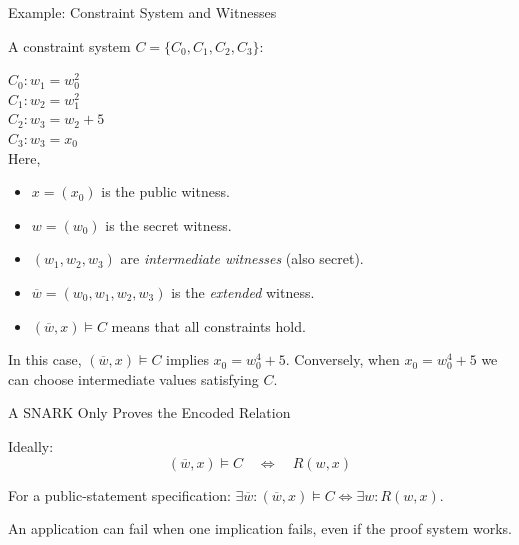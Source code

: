 \documentclass[aspectratio=169,11pt]{beamer}
\begin{document}
\begin{frame}{Example: Constraint System and Witnesses}

A constraint system $C = \{C_0, C_1, C_2, C_3\}$:

$C_0: w_1 = w_0^2$\\
$C_1: w_2 = w_1^2$\\
$C_2: w_3 = w_2 + 5$\\
$C_3: w_3 = x_0$\\
\pause
\vspace{\baselineskip}
Here,
\begin{itemize}
\item $x = (x_0)$ is the public witness.
\item $w = (w_0)$ is the secret witness. \pause
\item $(w_1,w_2,w_3)$ are \emph{intermediate witnesses} (also secret). \pause
\item $\overline w = (w_0, w_1, w_2, w_3)$ is the \emph{extended} witness. \pause
\item $(\overline w, x) \vDash C$ means that all constraints hold.
\end{itemize}
\pause

In this case, $(\overline w, x) \vDash C$ implies $x_0=w_0^4+5$. Conversely, when $x_0=w_0^4+5$ we can choose intermediate values satisfying $C$.
\end{frame}

\begin{frame}{A SNARK Only Proves the Encoded Relation}
\begin{center}\end{center}
\pause

Ideally:
\[\boxed{(\overline w, x) \vDash C \quad \Longleftrightarrow \quad R(w, x)}\]\vspace{-1mm}\begin{center}\footnotesize For a public-statement specification: $\exists \overline w: (\overline w, x) \vDash C \Leftrightarrow\exists w: R(w, x)$.\end{center}
\pause

An application can fail when one implication fails, even if the proof system works.
\end{frame}
\end{document}
